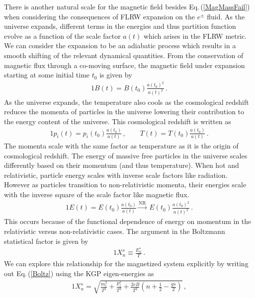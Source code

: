 \documentclass[Universe,article,submit,moreauthors,pdftex]{Definitions/mdpi}
\newcommand{\req}[1]{Eq.\,(\ref{#1})}
\begin{document}
There is another natural scale for the magnetic field besides \req{MagMassFail} when considering the consequences of FLRW expansion on the $e^{\pm}$ fluid. As the universe expands, different terms in the energies and thus partition function evolve as a function of the scale factor $a(t)$ which arises in the FLRW metric. We can consider the expansion to be an adiabatic process which results in a smooth shifting of the relevant dynamical quantities. From the conservation of magnetic flux through a co-moving surface, the magnetic field under expansion starting at some initial time $t_{0}$ is given by
\begin{alignat}{1}
    \label{BScale} B(t) = B(t_{0})\frac{a(t_{0})^{2}}{a(t)^{2}}\,.
\end{alignat}
As the universe expands, the temperature also cools as the cosmological redshift reduces the momenta of particles in the universe lowering their contribution to the energy content of the universe. This cosmological redshift is written as
\begin{alignat}{1}
  \label{Redshift} p_{i}(t) = p_{i}(t_{0})\frac{a(t_{0})}{a(t)}\,,\qquad T(t) = T(t_{0})\frac{a(t_{0})}{a(t)}\,.
\end{alignat}
The momenta scale with the same factor as temperature as it is the origin of cosmological redshift. The energy of massive free particles in the universe scales differently based on their momentum (and thus temperature). When hot and relativistic, particle energy scales with inverse scale factors like radiation. However as particles transition to non-relativistic momenta, their energies scale with the inverse square of the scale factor like magnetic flux.
\begin{alignat}{1}
    \label{EScale} E(t) = E(t_{0})\frac{a(t_{0})}{a(t)}\xrightarrow{\mathrm{NR}}\  E(t_{0})\frac{a(t_{0})^{2}}{a(t)^{2}}\,.
\end{alignat}
This occurs because of the functional dependence of energy on momentum in the relativistic versus non-relativistic cases. The argument in the Boltzmann statistical factor is given by
\begin{alignat}{1}
    \label{Boltz} X_{n}^{s}\equiv\frac{E_{n}^{s}}{T}\,.
\end{alignat}
We can explore this relationship for the magnetized system explicitly by writing out \req{Boltz} using the KGP eigen-energies as
\begin{alignat}{1}
    \label{XExplicit} X_{n}^{s} = \sqrt{\frac{m_{e}^{2}}{T^{2}}+\frac{p_{z}^{2}}{T^{2}}+\frac{2eB}{T^{2}}\left(n+\frac{1}{2}-\frac{gs}{2}\right)}\,,
\end{alignat}
\end{document}
